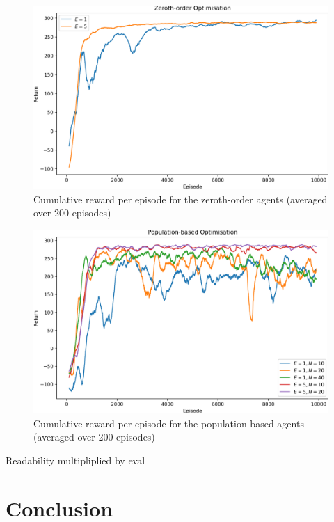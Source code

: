 \documentclass[10pt]{article}
\begin{document}
\begin{figure}
    \centering
    \includegraphics[width=\textwidth]{checkpoints/FINAL/zeroth_order.png}
    \caption{Cumulative reward per episode for the zeroth-order agents (averaged over 200 episodes)}
    \label{fig:zeroth_order}
\end{figure}

\begin{figure}
    \centering
    \includegraphics[width=\textwidth]{checkpoints/FINAL/population.png}
    \caption{Cumulative reward per episode for the population-based agents (averaged over 200 episodes)}
    \label{fig:population}
\end{figure}



Readability multipliplied by eval

\section{Conclusion}



\end{document}
